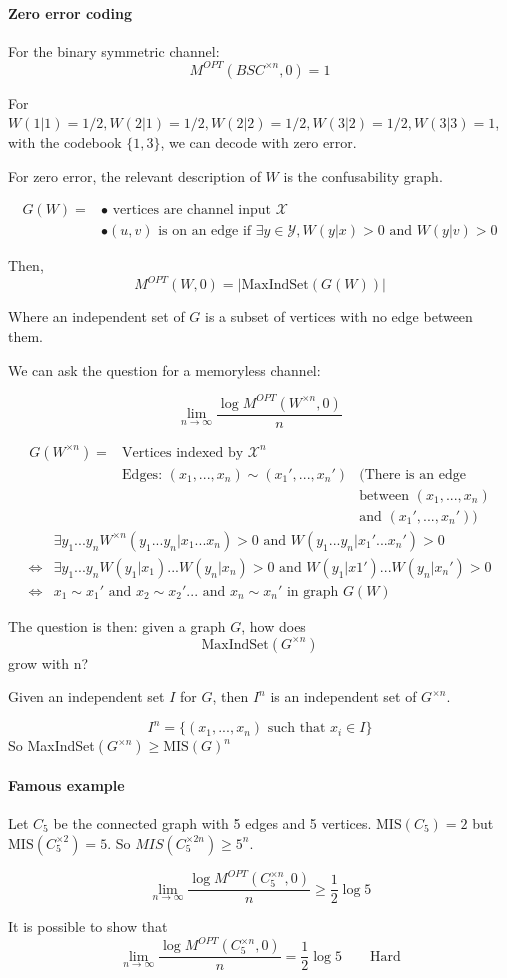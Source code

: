 \paragraph{Zero error coding}
For the binary symmetric channel:
\[M^{OPT}(BSC^{\times n},0)=1\]


For $W(1|1)=1/2, W(2|1)=1/2, W(2|2)=1/2, W(3|2)=1/2, W(3|3)=1$, with the codebook $\{1,3\}$, we can decode with zero error.

For zero error, the relevant description of $W$ is the confusability graph.

\begin{align*}
G(W) = & \bullet \text{ vertices are channel input }\mathcal{X} \\
& \bullet (u,v) \text{ is on an edge if } \exists y \in \mathcal{Y}, W(y|x)>0 \text{ and } W(y|v)>0
\end{align*}

Then, \[M^{OPT}(W,0)=|\text{MaxIndSet}(G(W))|\]

Where an independent set of $G$ is a subset of vertices with no edge between them.

We can ask the question for a memoryless channel:

\[\lim_{n\to \infty} \frac{\log M^{OPT}(W^{\times n},0)}{n}\]

\begin{align*}
G(W^{\times n}) = & \text{Vertices indexed by } \mathcal{X}^n\\
& \text{Edges: }(x_1,...,x_n)\sim(x_1',...,x_n') & \big(\text{There is an edge}\\
& & \text{between $(x_1,...,x_n)$}\\
& & \text{and $(x_1',...,x_n')$}\big)
\end{align*}
\begin{align*}
& \exists y_1...y_n W^{\times n}(y_1...y_n|x_1...x_n)>0   \text{ and } W(y_1...y_n|x_1'...x_n')>0\\
\Leftrightarrow  & \exists y_1...y_n W(y_1|x_1)...W(y_n|x_n) > 0 \text{ and } W(y_1|x1')...W(y_n|x_n')>0\\
\Leftrightarrow & x_1 \sim x_1' \text{ and } x_2\sim x_2' ... \text { and } x_n\sim x_n' \text{ in graph } G(W)
\end{align*}

The question is then: given a graph $G$, how does
\[\text{MaxIndSet}(G^{\times n})\]
grow with n?

Given an independent set $I$ for $G$, then $I^n$ is an independent set of $G^{\times n}$.

\[I^n=\{(x_1,...,x_n) \text{ such that } x_i\in I\}\]
So MaxIndSet$(G^{\times n})\geq \text{MIS}(G)^n$

\paragraph{Famous example}
Let $C_5$ be the connected graph with 5 edges and 5 vertices. $\text{MIS}(C_5)=2$ but $\text{MIS}(C_5^{\times 2})=5$.
So $MIS(C_5^{\times 2n})\geq 5^n$.

\[\lim_{n\to \infty}\frac{\log M^{OPT}(C_5^{\times n},0)}{n}\geq \frac{1}{2}\log 5\]

It is possible to show that 
\[\lim_{n\to \infty}\frac{\log M^{OPT}(C_5^{\times n},0)}{n} = \frac{1}{2}\log 5 \qquad \text{Hard}\]
